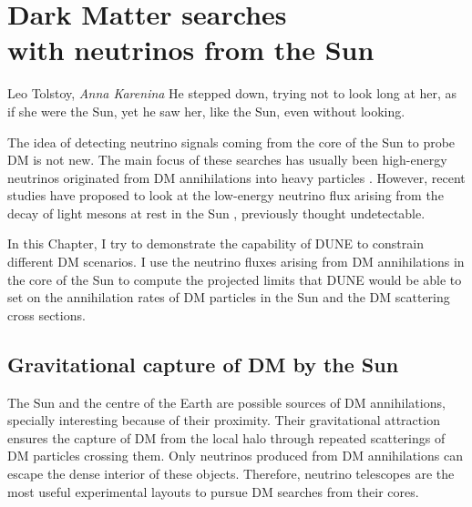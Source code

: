 \chapter[Dark Matter searches with neutrinos from the Sun]{Dark Matter searches\\ with neutrinos from the Sun}\label{chapter:dm_analysis}

\begin{chapquote}{Leo Tolstoy, \textit{Anna Karenina}}
	He stepped down, trying not to look long at her, as if she were the Sun, yet he saw her, like the Sun, even without looking.
\end{chapquote}

The idea of detecting neutrino signals coming from the core of the Sun to probe DM is not new. The main focus of these searches has usually been high-energy neutrinos originated from DM annihilations into heavy particles \cite{Silk1985, Srednicki1986, Hagelin1986, Gaisser1986}. However, recent studies have proposed to look at the low-energy neutrino flux arising from the decay of light mesons at rest in the Sun \cite{Bernal2012, Rott2012, Rott2015, DUNE2021}, previously thought undetectable.

%
In this Chapter, I try to demonstrate the capability of DUNE to constrain different DM scenarios. I use the neutrino fluxes arising from DM annihilations in the core of the Sun to compute the projected limits that DUNE would be able to set on the annihilation rates of DM particles in the Sun and the DM scattering cross sections.

\section{Gravitational capture of DM by the Sun}
\label{sec:dm_analysis_theory}

The Sun and the centre of the Earth are possible sources of DM annihilations, specially interesting because of their proximity. Their gravitational attraction ensures the capture of DM from the local halo through repeated scatterings of DM particles crossing them. Only neutrinos produced from DM annihilations can escape the dense interior of these objects. Therefore, neutrino telescopes are the most useful experimental layouts to pursue DM searches from their cores.

